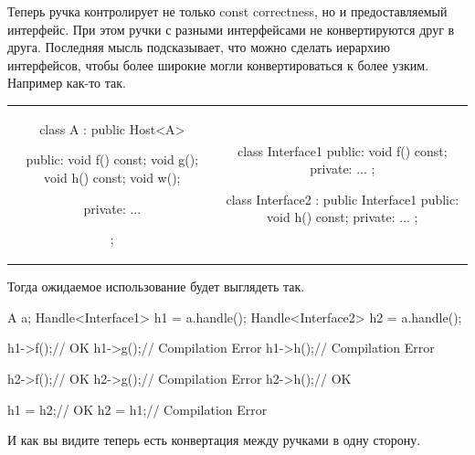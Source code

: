 Теперь ручка контролирует не только const correctness, но и предоставляемый интерфейс.
При этом ручки с разными интерфейсами не конвертируются друг в друга.
Последняя мысль подсказывает, что можно сделать иерархию интерфейсов, чтобы более широкие могли конвертироваться к более узким.
Например как-то так.
\begin{center}
\begin{tabular}{cc}
{
\begin{minipage}[\baselineskip]{8cm}
\begin{cppcode}[numbers = none]
class A : public Host<A> {
public:
  void f() const;
  void g();
  void h() const;
  void w();
  
private:
  ...
};



\end{cppcode}
\end{minipage}
}&{
\begin{minipage}[\baselineskip]{8cm}
\begin{cppcode}[numbers = none]
class Interface1 {
public:
  void f() const;
private:
  ...
};

class Interface2 : public Interface1 {
public:
  void h() const;
private:
  ...
};
\end{cppcode}
\end{minipage}
}\\
\end{tabular}
\end{center}
Тогда ожидаемое использование будет выглядеть так.
\begin{cppcode}
A a;
Handle<Interface1> h1 = a.handle();
Handle<Interface2> h2 = a.handle();
          
h1->f();// OK
h1->g();// Compilation Error
h1->h();// Compilation Error
  
h2->f();// OK
h2->g();// Compilation Error
h2->h();// OK

h1 = h2;// OK
h2 = h1;// Compilation Error
\end{cppcode}
И как вы видите теперь есть конвертация между ручками в одну сторону.

